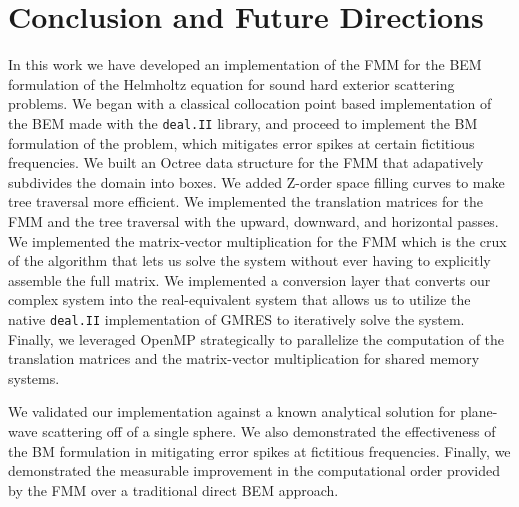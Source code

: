 \chapter{Conclusion and Future Directions}\label{chapter:conclusion-future-directions}

In this work we have developed an implementation of the \ac{FMM} for the \ac{BEM} formulation of the Helmholtz equation for sound hard exterior scattering problems. We began with a classical collocation point based implementation of the \ac{BEM} made with the \texttt{deal.II} library, and proceed to implement the \ac{BM} formulation of the problem, which mitigates error spikes at certain fictitious frequencies. We built an Octree data structure for the \ac{FMM} that adapatively subdivides the domain into boxes. We added Z-order space filling curves to make tree traversal more efficient. We implemented the translation matrices for the \ac{FMM} and the tree traversal with the upward, downward, and horizontal passes. We implemented the matrix-vector multiplication for the \ac{FMM} which is the crux of the algorithm that lets us solve the system without ever having to explicitly assemble the full matrix. We implemented a conversion layer that converts our complex system into the real-equivalent system that allows us to utilize the native \texttt{deal.II} implementation of \ac{GMRES} to iteratively solve the system. Finally, we leveraged OpenMP strategically to parallelize the computation of the translation matrices and the matrix-vector multiplication for shared memory systems.

We validated our implementation against a known analytical solution for plane-wave scattering off of a single sphere. We also demonstrated the effectiveness of the \ac{BM} formulation in mitigating error spikes at fictitious frequencies. Finally, we demonstrated the measurable improvement in the computational order provided by the \ac{FMM} over a traditional direct \ac{BEM} approach.

